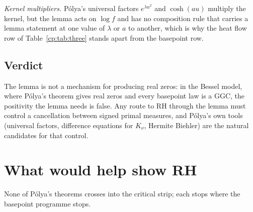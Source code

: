 \begin{table}[ht]
\centering\small
{}
\caption{$(-1)^j\frac{d^{2+j}}{d\nu^{2+j}}\log K_\nu(2\pi)$.}\label{pol:tab:bessel}
\end{table}

\emph{Kernel multipliers.} P\'olya's universal factors $e^{\lambda u^2}$ and $\cosh(au)$ multiply the kernel, but the lemma acts on $\log f$ and has no composition rule that carries a lemma statement at one value of $\lambda$ or $a$ to another, which is why the heat flow row of Table~\ref{cp:tab:three} stands apart from the basepoint row.

\subsection{Verdict}
The lemma is not a mechanism for producing real zeros: in the Bessel model, where P\'olya's theorem gives real zeros and every basepoint law is a GGC, the positivity the lemma needs is false. Any route to RH through the lemma must control a cancellation between signed primal measures, and P\'olya's own tools (universal factors, difference equations for $K_\nu$, Hermite Biehler) are the natural candidates for that control.

\section{What would help show RH}

None of P\'olya's theorems crosses into the critical strip; each stops where the basepoint programme stops.

